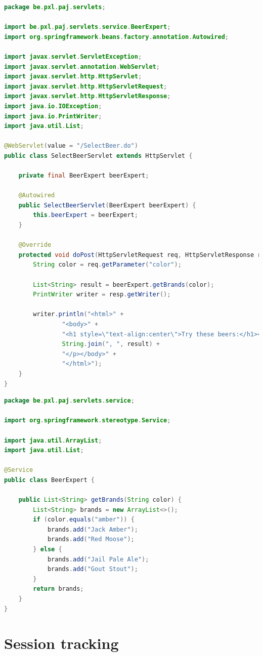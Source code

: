\begin{lstlisting}[frame=single, language=java]
package be.pxl.paj.servlets;

import be.pxl.paj.servlets.service.BeerExpert;
import org.springframework.beans.factory.annotation.Autowired;

import javax.servlet.ServletException;
import javax.servlet.annotation.WebServlet;
import javax.servlet.http.HttpServlet;
import javax.servlet.http.HttpServletRequest;
import javax.servlet.http.HttpServletResponse;
import java.io.IOException;
import java.io.PrintWriter;
import java.util.List;

@WebServlet(value = "/SelectBeer.do")
public class SelectBeerServlet extends HttpServlet {

	private final BeerExpert beerExpert;

	@Autowired
	public SelectBeerServlet(BeerExpert beerExpert) {
		this.beerExpert = beerExpert;
	}

	@Override
	protected void doPost(HttpServletRequest req, HttpServletResponse resp) throws ServletException, IOException {
		String color = req.getParameter("color");

		List<String> result = beerExpert.getBrands(color);
		PrintWriter writer = resp.getWriter();

		writer.println("<html>" +
				"<body>" +
				"<h1 style=\"text-align:center\">Try these beers:</h1><p>" +
				String.join(", ", result) +
				"</p></body>" +
				"</html>");
	}
}
\end{lstlisting}

\begin{lstlisting}[frame=single, language=java]
package be.pxl.paj.servlets.service;

import org.springframework.stereotype.Service;

import java.util.ArrayList;
import java.util.List;

@Service
public class BeerExpert {

	public List<String> getBrands(String color) {
		List<String> brands = new ArrayList<>();
		if (color.equals("amber")) {
			brands.add("Jack Amber");
			brands.add("Red Moose");
		} else {
			brands.add("Jail Pale Ale");
			brands.add("Gout Stout");
		}
		return brands;
	}
}
\end{lstlisting}


\section{Session tracking}

